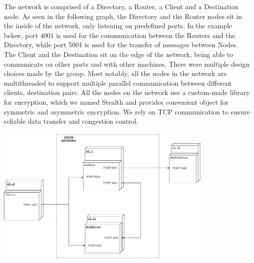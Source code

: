 \documentclass[10pt]{report}
\begin{document}
\noindent The network is comprised of a Directory, a Router, a Client and a Destination node. As seen in the following graph, the Directory and the Router nodes sit in the inside of the
network, only listening on predefined ports. In the example below, port 4001 is used for the communication between the Routers and the Directory, while port 5001 is used for the transfer of messages between Nodes.  The Client and the Destination sit on the edge
of the network, being able to communicate on other ports and with other machines. There were multiple design choices made by the group. Most notably, all the nodes in the network are multithreaded to support multiple parallel communication between different clients, destination pairs. All the nodes on the network use a custom-made library for encryption, which we named Stealth and provides convenient object for symmetric and asymmetric encryption. We rely on TCP communication to ensure reliable data transfer and congestion control. \\

\begin{center}
    \includegraphics[width=0.8\textwidth]{Deployment}    
\end{center}
\end{document}
